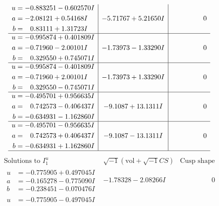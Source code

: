 \documentclass[1p]{elsarticle_modified}
\theoremstyle{definition}
\newcommand{\I}{\sqrt{-1}}
\begin{document}
$$\begin{array}{c|c|c}
\begin{aligned}
u &= -0.883251 - 0.602570 I \\
a &= -2.08121 + 0.54168 I \\
b &= \phantom{-}0.83111 + 1.31723 I\end{aligned}
 & -5.71767 + 5.21650 I & \phantom{-0.000000 } 0 \\ \hline\begin{aligned}
u &= -0.995874 + 0.401809 I \\
a &= -0.71960 - 2.00101 I \\
b &= \phantom{-}0.329550 + 0.745071 I\end{aligned}
 & -1.73973 - 1.33290 I & \phantom{-0.000000 } 0 \\ \hline\begin{aligned}
u &= -0.995874 - 0.401809 I \\
a &= -0.71960 + 2.00101 I \\
b &= \phantom{-}0.329550 - 0.745071 I\end{aligned}
 & -1.73973 + 1.33290 I & \phantom{-0.000000 } 0 \\ \hline\begin{aligned}
u &= -0.495701 + 0.956635 I \\
a &= \phantom{-}0.742573 - 0.406437 I \\
b &= -0.634931 - 1.162860 I\end{aligned}
 & -9.1087 + 13.1311 I & \phantom{-0.000000 } 0 \\ \hline\begin{aligned}
u &= -0.495701 - 0.956635 I \\
a &= \phantom{-}0.742573 + 0.406437 I \\
b &= -0.634931 + 1.162860 I\end{aligned}
 & -9.1087 - 13.1311 I & \phantom{-0.000000 } 0\\
 \hline 
 \end{array}$$\newpage$$\begin{array}{c|c|c}  
\text{Solutions to }I^u_{1}& \I (\text{vol} + \sqrt{-1}CS) & \text{Cusp shape}\\
 \hline 
\begin{aligned}
u &= -0.775905 + 0.497045 I \\
a &= -0.165278 - 0.775090 I \\
b &= -0.238451 - 0.070476 I\end{aligned}
 & -1.78328 - 2.08266 I & \phantom{-0.000000 } 0 \\ \hline\begin{aligned}
u &= -0.775905 - 0.497045 I \\

\end{aligned}
\end{array}$$
\end{document}
